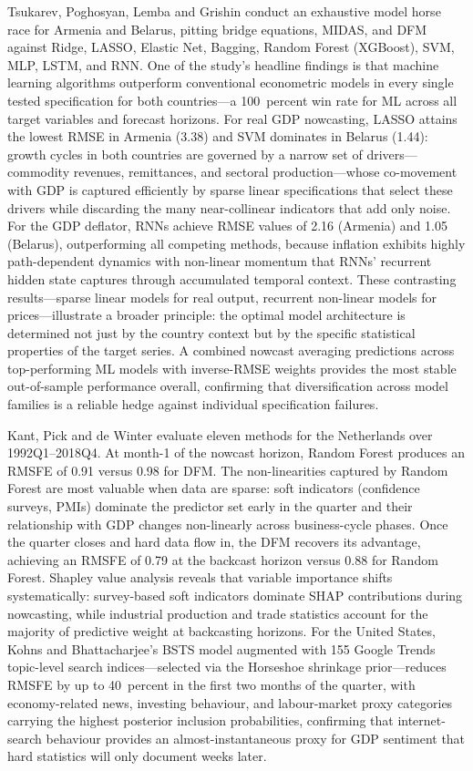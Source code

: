 \documentclass[12pt,a4paper]{report}
\begin{document}
Tsukarev, Poghosyan, Lemba and Grishin conduct an exhaustive model
horse race for Armenia and Belarus, pitting bridge equations, MIDAS,
and DFM against Ridge, LASSO, Elastic Net, Bagging, Random Forest
(XGBoost), SVM, MLP, LSTM, and RNN.\citep{ArmeniaBelarus2024} One of
the study's headline findings is that machine learning algorithms
outperform conventional econometric models in every single tested
specification for both countries---a 100~percent win rate for ML across
all target variables and forecast horizons. For real GDP nowcasting,
LASSO attains the lowest RMSE in Armenia (3.38) and SVM dominates in
Belarus (1.44): growth cycles in both countries are governed by a narrow
set of drivers---commodity revenues, remittances, and sectoral
production---whose co-movement with GDP is captured efficiently by
sparse linear specifications that select these drivers while discarding
the many near-collinear indicators that add only noise. For the GDP
deflator, RNNs achieve RMSE values of 2.16 (Armenia) and 1.05
(Belarus), outperforming all competing methods, because inflation
exhibits highly path-dependent dynamics with non-linear momentum that
RNNs' recurrent hidden state captures through accumulated temporal
context. These contrasting results---sparse linear models for real
output, recurrent non-linear models for prices---illustrate a broader
principle: the optimal model architecture is determined not just by the
country context but by the specific statistical properties of the target
series. A combined nowcast averaging predictions across top-performing
ML models with inverse-RMSE weights provides the most stable
out-of-sample performance overall, confirming that diversification
across model families is a reliable hedge against individual
specification failures.

Kant, Pick and de Winter evaluate eleven methods for the Netherlands
over 1992Q1--2018Q4.\citep{NetherlandsDNB2022} At month-1 of the nowcast
horizon, Random Forest produces an RMSFE of 0.91 versus 0.98 for DFM.
The non-linearities captured by Random Forest are most valuable when
data are sparse: soft indicators (confidence surveys, PMIs) dominate
the predictor set early in the quarter and their relationship with GDP
changes non-linearly across business-cycle phases. Once the quarter
closes and hard data flow in, the DFM recovers its advantage, achieving
an RMSFE of 0.79 at the backcast horizon versus 0.88 for Random Forest.
Shapley value analysis reveals that variable importance shifts
systematically: survey-based soft indicators dominate SHAP contributions
during nowcasting, while industrial production and trade statistics
account for the majority of predictive weight at backcasting horizons.
For the United States, Kohns and Bhattacharjee's BSTS model augmented
with 155 Google Trends topic-level search indices---selected via the
Horseshoe shrinkage prior---reduces RMSFE by up to 40~percent in the
first two months of the quarter, with economy-related news, investing
behaviour, and labour-market proxy categories carrying the highest
posterior inclusion probabilities, confirming that internet-search
behaviour provides an almost-instantaneous proxy for GDP sentiment that
hard statistics will only document weeks later.\citep{US2022}
\end{document}
